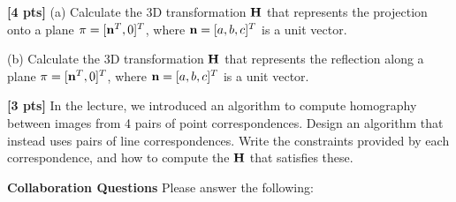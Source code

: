 \documentclass[11pt,addpoints,answers]{exam}
\numberwithin{equation}{section} %
\numberwithin{figure}{section} %
\numberwithin{table}{section} %
\begin{document}
\begin{questions}
\begin{tcolorbox}[fit,height=5cm, width=\textwidth, blank, borderline={0.5pt}{-2pt},halign=left, valign=center, nobeforeafter]



\end{tcolorbox}

\question \textbf{[4 pts]} (a) Calculate the 3D transformation $\mathbf{H}$ that represents the projection onto a plane $\pi = [\mathbf{n}^T, 0]^T$, where $\mathbf{n} = [a,b,c]^T$ is a unit vector.

(b) Calculate the 3D transformation $\mathbf{H}$ that represents the reflection along a plane $\pi = [\mathbf{n}^T, 0]^T$, where $\mathbf{n} = [a,b,c]^T$ is a unit vector.

\begin{tcolorbox}[fit,height=15cm, width=\textwidth, blank, borderline={0.5pt}{-2pt},halign=left, valign=center, nobeforeafter]



\end{tcolorbox}

\question \textbf{[3 pts]} In the lecture, we introduced an algorithm to compute homography between images from 4 pairs of point correspondences. Design an algorithm that instead uses pairs of line correspondences. Write the constraints provided by each correspondence, and how to compute the $\mathbf{H}$ that satisfies these.

\begin{tcolorbox}[fit,height=5cm, width=\textwidth, blank, borderline={0.5pt}{-2pt},halign=left, valign=center, nobeforeafter]



\end{tcolorbox}


\end{questions}

\clearpage

\textbf{Collaboration Questions} Please answer the following:
\end{document}
